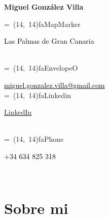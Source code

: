 \documentclass[spanish,10.5pt,A4]{article}
\newcommand*{\vcenteredhbox}[1]{\begingroup
\setbox0=\hbox{#1}\parbox{\wd0}{\box0}\endgroup}
\newcommand{\icon}[3] { 							
	\makebox(#2, #2){\textcolor{maincol}{\csname fa#1\endcsname}}
}
\newcommand{\icontext}[4]{ 						
	\vcenteredhbox{\icon{#1}{#2}{#3}}  \hspace{0.5pt}  \parbox{0.9\mpwidth}{\textcolor{#4}{#3}}
}
\newcommand{\iconemail}[5]{ 						
    \vcenteredhbox{\icon{#1}{#2}{#5}}  \hspace{0.5pt} \href{mailto:#4}{\textcolor{#5}{#3}}
}
\newcommand{\mpwidth}{\linewidth-\fboxsep-\fboxsep}
\newcommand{\cvqrcode}[1] {
	\begin{center}
		\texttt{[image: qrcode]}
	\end{center}
}
\begin{document}
\setlength{\columnsep}{4.2em}
\setlength{\columnseprule}{1pt}
\begin{paracol}{2}
\begin{leftcolumn}
\begin{center}
	
	\vspace{4mm}

	{\Large \bfseries Miguel González Villa}

\end{center}

\icontext{MapMarker}{14}{Las Palmas de Gran Canaria}{black}\\[6pt]
\iconemail{EnvelopeO}{14}{miguel.gonzalez.villa@gmail.com}{miguel.gonzalez.villa@gmail.com}{black}\\[6pt]
\icontext{Linkedin}{14}{\href{https://linkedin.com/in/miguel-gonzalez-villa}{LinkedIn}}{black}\\[6pt]
\icontext{Phone}{14}{+34 634 825 318}{black}\\[6pt]

\vspace{-8mm}

\section* {Sobre mi}


\end{leftcolumn}
\end{paracol}
\end{document}
